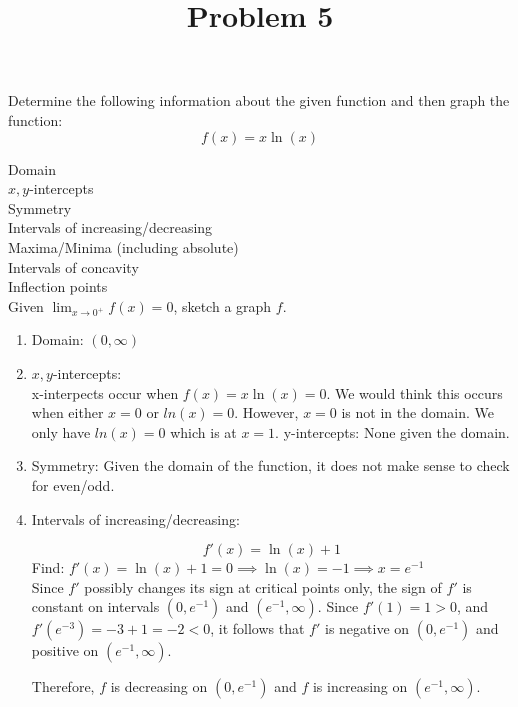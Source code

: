 \documentclass{ximera}
\title[Problem 5]{Problem 5}
\begin{document}
\begin{abstract} \end{abstract}
\maketitle


\begin{problem}
  Determine the following information about the given function and then graph the function:
  \[
    f(x) = x\ln(x)
  \]

 Domain\\
  $x,y$-intercepts\\
  Symmetry\\
  Intervals of increasing/decreasing\\
  Maxima/Minima (including absolute)\\
  Intervals of concavity\\
  Inflection points\\
Given $\lim_{x \to 0^+}f(x)=0$, sketch a graph $f$.

\begin{explanation}
\begin{enumerate}


\item Domain: $(0,\infty)$

\item $x,y$-intercepts:\\
x-interpects occur when $f(x) = x\ln(x) =0$.  We would think this occurs when either $x=0$ or $ln(x)=0$.  However, $x=0$ is not in the domain.  We only have $ln(x)=0$ which is at $x=1$.
y-intercepts: None given the domain.


\item Symmetry: Given the domain of the function, it does not make sense to check for even/odd.

\item Intervals of increasing/decreasing:

$$f'(x)=\ln(x)+1$$
Find: $f'(x)=\ln(x)+1=0 \implies \ln(x)=-1 \implies x=e^{-1}$\\

Since $f'$ possibly changes its sign at critical points only, the sign of $f'$ is constant on intervals $(0,e^{-1})$ and $(e^{-1},\infty)$. 
Since $f'(1)=1>0$, and $f'(e^{-3})=-3+1=-2<0$, it follows that $f'$ is negative on $(0,e^{-1})$ and positive on $(e^{-1},\infty)$. 

Therefore, $f$ is decreasing on $(0,e^{-1})$ and $f$ is increasing on $(e^{-1},\infty)$. 


\end{enumerate}
\end{explanation}
\end{problem}
\end{document}
